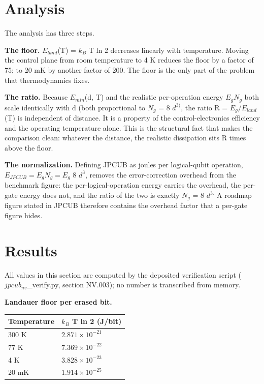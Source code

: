 \documentclass[11pt]{article}
\begin{document}
\section{Analysis}
The analysis has three steps.

\textbf{The floor.} $E_{land}$(T) = $k_{B}$ T ln 2 decreases linearly with temperature. Moving the control plane from room temperature to 4 K reduces the floor by a factor of 75; to 20 mK by another factor of 200. The floor is the only part of the problem that thermodynamics fixes.

\textbf{The ratio.} Because $E_{min}$(d, T) and the realistic per-operation energy $E_{g}   N_{g}$ both scale identically with d (both proportional to $N_{g}$ = 8 $d^{3)}$, the ratio R = $E_{g} / E_{land}$(T) is independent of distance. It is a property of the control-electronics efficiency and the operating temperature alone. This is the structural fact that makes the comparison clean: whatever the distance, the realistic dissipation sits R times above the floor.

\textbf{The normalization.} Defining JPCUB as joules per logical-qubit operation, $E_{JPCUB} = E_{g}   N_{g} = E_{g}$ 8 $d^{3}$, removes the error-correction overhead from the benchmark figure: the per-logical-operation energy carries the overhead, the per-gate energy does not, and the ratio of the two is exactly $N_{g}$ = 8 $d^{3.}$ A roadmap figure stated in JPCUB therefore contains the overhead factor that a per-gate figure hides.

\section{Results}
All values in this section are computed by the deposited verification script ($jpcub_{nv}$\_verify.py, section NV.003); no number is transcribed from memory.

\textbf{Landauer floor per erased bit.}

\begin{table}[h]
\centering
\begin{tabular}{ll}
\toprule
Temperature & $k_{B}$ T ln 2 (J/bit) \\
\midrule
300 K & $2.871\times 10^{-21}$ \\
77 K & $7.369\times 10^{-22}$ \\
4 K & $3.828\times 10^{-23}$ \\
20 mK & $1.914\times 10^{-25}$ \\
\bottomrule
\end{tabular}
\end{table}
\end{document}
